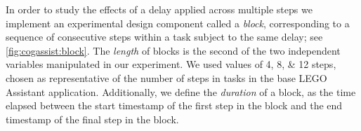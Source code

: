 \documentclass[10pt,letterpaper]{article}
\providecommand{\DIFaddtex}[1]{#1} %
\providecommand{\DIFdeltex}[1]{} %
\providecommand{\DIFaddbegin}{\protect\color{blue}} %
\providecommand{\DIFaddend}{\protect\color{black}} %
\providecommand{\DIFdelbegin}{\protect\color{red}} %
\providecommand{\DIFdelend}{\protect\color{black}} %
\providecommand{\DIFadd}[1]{\texorpdfstring{\DIFaddtex{#1}}{#1}} %
\providecommand{\DIFdel}[1]{\texorpdfstring{\DIFdeltex{#1}}{}} %
\newcommand{\DIFscaledelfig}{0.5}
\newlength{\DIFdelgraphicswidth} %
\newlength{\DIFdelgraphicsheight} %
\newcommand{\DIFaddincludegraphics}[2][]{{\color{blue}\fbox{\DIFOincludegraphics[#1]{#2}}}} %
\newcommand{\DIFdelincludegraphics}[2][]{%
\sbox{\DIFdelgraphicsbox}{\DIFOincludegraphics[#1]{#2}}%
\settoboxwidth{\DIFdelgraphicswidth}{\DIFdelgraphicsbox} %
\settoboxtotalheight{\DIFdelgraphicsheight}{\DIFdelgraphicsbox} %
\scalebox{\DIFscaledelfig}{%
\parbox[b]{\DIFdelgraphicswidth}{\usebox{\DIFdelgraphicsbox}\\[-\baselineskip] \rule{\DIFdelgraphicswidth}{0em}}\llap{\resizebox{\DIFdelgraphicswidth}{\DIFdelgraphicsheight}{%
\setlength{\unitlength}{\DIFdelgraphicswidth}%
\begin{picture}(1,1)%
\thicklines\linethickness{2pt} %
{\color[rgb]{1,0,0}\put(0,0){\framebox(1,1){}}}%
{\color[rgb]{1,0,0}\put(0,0){\line( 1,1){1}}}%
{\color[rgb]{1,0,0}\put(0,1){\line(1,-1){1}}}%
\end{picture}%
}\hspace*{3pt}}} %
} %
\DeclareRobustCommand{\DIFaddbegin}{\DIFOaddbegin \let\includegraphics\DIFaddincludegraphics} %
\DeclareRobustCommand{\DIFaddend}{\DIFOaddend \let\includegraphics\DIFOincludegraphics} %
\DeclareRobustCommand{\DIFdelbegin}{\DIFOdelbegin \let\includegraphics\DIFdelincludegraphics} %
\DeclareRobustCommand{\DIFdelend}{\DIFOaddend \let\includegraphics\DIFOincludegraphics} %
\begin{document}
\DIFdelbegin \DIFdel{Additionally, in }\DIFdelend \DIFaddbegin \DIFadd{In }\DIFaddend order to study the effects of a delay applied across multiple steps \DIFdelbegin \DIFdel{, we implemented }\DIFdelend \DIFaddbegin \DIFadd{we implement }\DIFaddend an experimental design component called a \emph{block}\DIFaddbegin \DIFadd{, corresponding to a }\DIFaddend sequence of consecutive steps within a task subject to the same delay; see \cref{fig:cogassist:block}.
The \emph{length} of \DIFdelbegin \DIFdel{a block corresponds to the number of steps it encompasses, and }\DIFdelend \DIFaddbegin \DIFadd{blocks }\DIFaddend is the second of the two independent variables manipulated in our experiment.
We used values of \numlist{4;8;12} steps\DIFdelbegin \DIFdel{for the lengths, values }\DIFdelend \DIFaddbegin \DIFadd{, }\DIFaddend chosen as representative of the number of steps in tasks in the base LEGO Assistant application.
Additionally, we define the \emph{duration} of a block, as the time elapsed between the start timestamp of the first step in the block and the end timestamp of the final step in the block\DIFdelbegin \DIFdel{; e.
g.\ for \cref{fig:cogassist:block}, the duration of the pictured block would be \( t_{n+k} - t_{n} \)}\DIFdelend .
\DIFdelbegin %
\DIFdelend %
\end{document}
